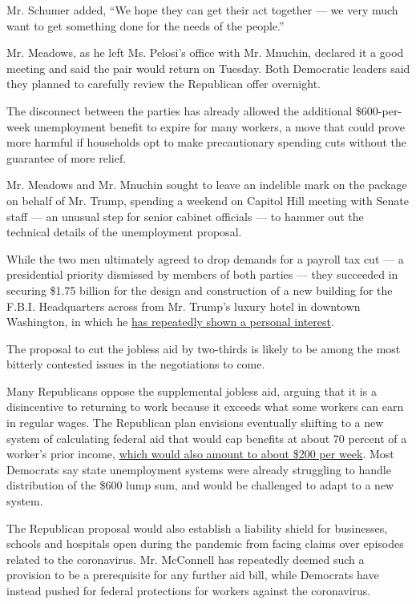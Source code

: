 Mr. Schumer added, ``We hope they can get their act together --- we very
much want to get something done for the needs of the people.''

Mr. Meadows, as he left Ms. Pelosi's office with Mr. Mnuchin, declared
it a good meeting and said the pair would return on Tuesday. Both
Democratic leaders said they planned to carefully review the Republican
offer overnight.

The disconnect between the parties has already allowed the additional
\$600-per-week unemployment benefit to expire for many workers, a move
that could prove more harmful if households opt to make precautionary
spending cuts without the guarantee of more relief.

Mr. Meadows and Mr. Mnuchin sought to leave an indelible mark on the
package on behalf of Mr. Trump, spending a weekend on Capitol Hill
meeting with Senate staff --- an unusual step for senior cabinet
officials --- to hammer out the technical details of the unemployment
proposal.

While the two men ultimately agreed to drop demands for a payroll tax
cut --- a presidential priority dismissed by members of both parties ---
they succeeded in securing \$1.75 billion for the design and
construction of a new building for the F.B.I. Headquarters across from
Mr. Trump's luxury hotel in downtown Washington, in which he
\href{https://www.nytimes.com/2018/10/18/us/politics/fbi-headquarters-building-trump.html}{has
repeatedly shown a personal interest}.

The proposal to cut the jobless aid by two-thirds is likely to be among
the most bitterly contested issues in the negotiations to come.

Many Republicans oppose the supplemental jobless aid, arguing that it is
a disincentive to returning to work because it exceeds what some workers
can earn in regular wages. The Republican plan envisions eventually
shifting to a new system of calculating federal aid that would cap
benefits at about 70 percent of a worker's prior income,
\href{https://www.nytimes.com/2020/07/23/business/economy/unemployment-benefits.html}{which
would also amount to about \$200 per week}. Most Democrats say state
unemployment systems were already struggling to handle distribution of
the \$600 lump sum, and would be challenged to adapt to a new system.

The Republican proposal would also establish a liability shield for
businesses, schools and hospitals open during the pandemic from facing
claims over episodes related to the coronavirus. Mr. McConnell has
repeatedly deemed such a provision to be a prerequisite for any further
aid bill, while Democrats have instead pushed for federal protections
for workers against the coronavirus.

